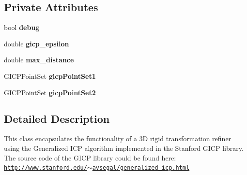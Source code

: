 \subsection*{Private Attributes}
\begin{DoxyCompactItemize}
\item 
\hypertarget{class_i_c_p_pose_refiner___stanford_g_i_c_p_a89681c536d6d4907cdaa8ab0d30f5728}{
bool {\bfseries debug}}
\label{class_i_c_p_pose_refiner___stanford_g_i_c_p_a89681c536d6d4907cdaa8ab0d30f5728}

\item 
\hypertarget{class_i_c_p_pose_refiner___stanford_g_i_c_p_a8e42ad076b05c36552d0e704ee156976}{
double {\bfseries gicp\_\-epsilon}}
\label{class_i_c_p_pose_refiner___stanford_g_i_c_p_a8e42ad076b05c36552d0e704ee156976}

\item 
\hypertarget{class_i_c_p_pose_refiner___stanford_g_i_c_p_ac4efce272acf7630f58e60d3b6629cea}{
double {\bfseries max\_\-distance}}
\label{class_i_c_p_pose_refiner___stanford_g_i_c_p_ac4efce272acf7630f58e60d3b6629cea}

\item 
\hypertarget{class_i_c_p_pose_refiner___stanford_g_i_c_p_a415c953f2b86d6b4433322d4ac57bf3a}{
GICPPointSet {\bfseries gicpPointSet1}}
\label{class_i_c_p_pose_refiner___stanford_g_i_c_p_a415c953f2b86d6b4433322d4ac57bf3a}

\item 
\hypertarget{class_i_c_p_pose_refiner___stanford_g_i_c_p_a894be0011b387374fa6f50ce5706d81e}{
GICPPointSet {\bfseries gicpPointSet2}}
\label{class_i_c_p_pose_refiner___stanford_g_i_c_p_a894be0011b387374fa6f50ce5706d81e}

\end{DoxyCompactItemize}


\subsection{Detailed Description}
This class encapsulates the functionality of a 3D rigid transformation refiner using the Generalized ICP algorithm implemented in the Stanford GICP library. The source code of the GICP library could be found here: \href{http://www.stanford.edu/~avsegal/generalized_icp.html}{\tt http://www.stanford.edu/$\sim$avsegal/generalized\_\-icp.html} 

